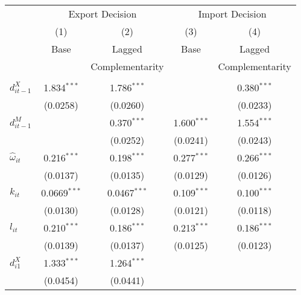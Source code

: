 \begin{center}
\begin{tabular}{l*{4}{c}}
\hline\hline&\multicolumn{2}{c}{Export
              Decision}&\multicolumn{2}{c}{Import Decision}\\
            &\multicolumn{1}{c}{(1)}&\multicolumn{1}{c}{(2)}&\multicolumn{1}{c}{(3)}&\multicolumn{1}{c}{(4)}\\
            &\multicolumn{1}{c}{Base}&\multicolumn{1}{c}{Lagged}&\multicolumn{1}{c}{Base}&\multicolumn{1}{c}{Lagged}\\
&\multicolumn{1}{c}{}&\multicolumn{1}{c}{Complementarity}&\multicolumn{1}{c}{}&\multicolumn{1}{c}{Complementarity}\\
\hline
        &                     &                     &                     &                     \\
$d_{it-1}^{X}$      &       1.834$^{***}$&       1.786$^{***}$&                     &       0.380$^{***}$\\
            &    (0.0258)         &    (0.0260)         &
                                    &    (0.0233)         \\
[1em]
$d_{it-1}^{M}$      &                     &       0.370$^{***}$&       1.600$^{***}$&       1.554$^{***}$\\
            &                     &    (0.0252)         &    (0.0241)         &    (0.0243)         \\
[1em]
$\hat{\omega}_{it}$       &       0.216$^{***}$&       0.198$^{***}$&       0.277$^{***}$&       0.266$^{***}$\\
            &    (0.0137)         &    (0.0135)         &    (0.0129)         &    (0.0126)         \\
[1em]
$k_{it}$        &      0.0669$^{***}$&      0.0467$^{***}$&       0.109$^{***}$&       0.100$^{***}$\\
            &    (0.0130)         &    (0.0128)         &    (0.0121)         &    (0.0118)         \\
[1em]
$l_{it}$     &       0.210$^{***}$&       0.186$^{***}$&       0.213$^{***}$&       0.186$^{***}$\\
            &    (0.0139)         &    (0.0137)         &    (0.0125)         &    (0.0123)         \\
[1em]
$d_{i1}^{X}$     &       1.333$^{***}$&       1.264$^{***}$&                     &                     \\
            &    (0.0454)         &    (0.0441)         &                     &                     \\

\end{tabular}
\end{center}
